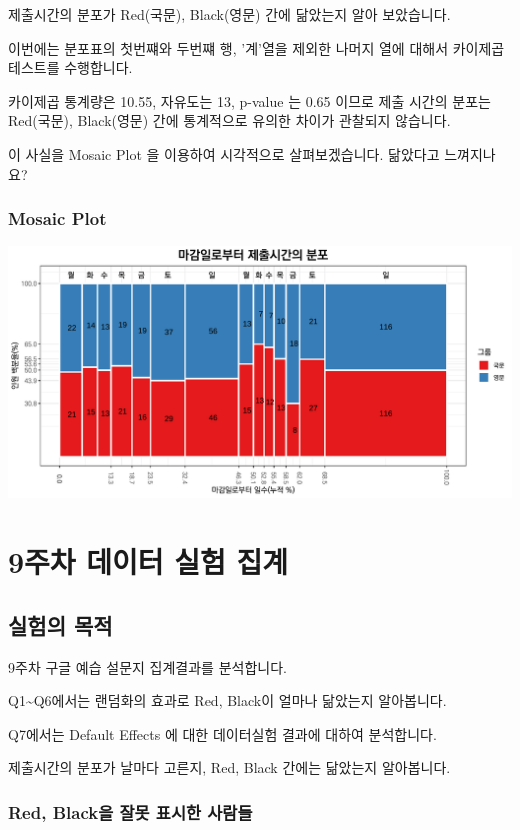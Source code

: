 \documentclass[
]{book}
\begin{document}
제출시간의 분포가 Red(국문), Black(영문) 간에 닮았는지 알아 보았습니다.

이번에는 분포표의 첫번쨰와 두번쨰 행, '계'열을 제외한 나머지 열에 대해서 카이제곱테스트를 수행합니다.

카이제곱 통계량은 10.55, 자유도는 13, p-value 는 0.65 이므로 제출 시간의 분포는 Red(국문), Black(영문) 간에 통계적으로 유의한 차이가 관찰되지 않습니다.

이 사실을 Mosaic Plot 을 이용하여 시각적으로 살펴보겠습니다. 닮았다고 느껴지나요?

\subsection{Mosaic Plot}\label{mosaic-plot-20}

\includegraphics{Quiz_report_2025_files/figure-latex/unnamed-chunk-249-1.pdf}

\chapter{9주차 데이터 실험 집계}\label{uxc8fcuxcc28-uxb370uxc774uxd130-uxc2e4uxd5d8-uxc9d1uxacc4-8}

\section{실험의 목적}\label{uxc2e4uxd5d8uxc758-uxbaa9uxc801-9}

9주차 구글 예습 설문지 집계결과를 분석합니다.

Q1\textasciitilde Q6에서는 랜덤화의 효과로 Red, Black이 얼마나 닮았는지 알아봅니다.

Q7에서는 Default Effects 에 대한 데이터실험 결과에 대하여 분석합니다.

제출시간의 분포가 날마다 고른지, Red, Black 간에는 닮았는지 알아봅니다.

\subsection{Red, Black을 잘못 표시한 사람들}\label{red-blackuxc744-uxc798uxbabb-uxd45cuxc2dcuxd55c-uxc0acuxb78cuxb4e4-9}
\end{document}
